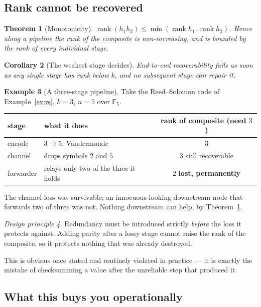 \documentclass[11pt,a4paper]{article}
\newtheorem{theorem}{Theorem}[section]
\newtheorem{corollary}[theorem]{Corollary}
\theoremstyle{definition}
\newtheorem{example}[theorem]{Example}
\theoremstyle{remark}
\newtheorem{principle}[theorem]{Design principle}
\newcommand{\FF}{\mathbb{F}}
\DeclareMathOperator{\rank}{rank}
\begin{document}
\subsection{Rank cannot be recovered}

\begin{theorem}[Monotonicity]\label{thm:mono}
$\rank(h_1 h_2) \leq \min(\rank h_1, \rank h_2)$. Hence along a pipeline the rank of
the composite is non-increasing, and is bounded by the rank of every individual stage.
\end{theorem}

\begin{corollary}[The weakest stage decides]
End-to-end recoverability fails as soon as any single stage has rank below $k$, and no
subsequent stage can repair it.
\end{corollary}

\begin{example}[A three-stage pipeline]\label{ex:pipeline}
Take the Reed--Solomon code of Example~\ref{ex:rs}, $k=3$, $n=5$ over $\FF_5$.
\begin{center}
\small
\begin{tabular}{llc}
\toprule
stage & what it does & rank of composite (need $3$) \\
\midrule
encode & $3 \to 5$, Vandermonde & $3$ \\
channel & drops symbols $2$ and $5$ & $3$ \quad still recoverable \\
forwarder & relays only two of the three it holds & $2$ \quad \textbf{lost, permanently} \\
\bottomrule
\end{tabular}
\end{center}
The channel loss was survivable; an innocuous-looking downstream node that forwards
two of three was not. Nothing downstream can help, by Theorem~\ref{thm:mono}.
\end{example}

\begin{principle}\label{prin:before}
Redundancy must be introduced strictly \emph{before} the loss it protects against.
Adding parity after a lossy stage cannot raise the rank of the composite, so it
protects nothing that was already destroyed.
\end{principle}

This is obvious once stated and routinely violated in practice --- it is exactly the
mistake of checksumming a value after the unreliable step that produced it.

\subsection{What this buys you operationally}
\end{document}

